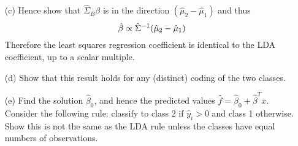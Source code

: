 \documentclass[10pt]{article}
\begin{document}
\begin{enumerate}[1.]
\begin{itemize}
        	\item[(c)] Hence show that $\hat\Sigma_B\beta$ is in the direction $(\hat\mu_2 − \hat\mu_1)$ and thus
            $$
                \hat\beta \propto\hat\Sigma^{-1}(\hat\mu_2-\hat\mu_1)\\
            $$
            Therefore the least squares regression coefficient is identical to the LDA coefficient, up to a scalar multiple.
            ~
            \item[(d)] Show that this result holds for any (distinct) coding of the two classes.~
            \item[(e)]   Find the solution $\hat\beta_0$, and hence the predicted values $\hat f=\hat\beta_0+\hat\beta^Tx$.
            Consider the following rule: classify to class 2 if $\hat y_i>0$ and class 1 otherwise. Show this is not the same as the LDA rule unless the classes have equal numbers of observations.  ~ 	
        \end{itemize}
        \fi
    	
\end{enumerate}
% 
% 
% 
% 
% 

%
%
\end{document}
